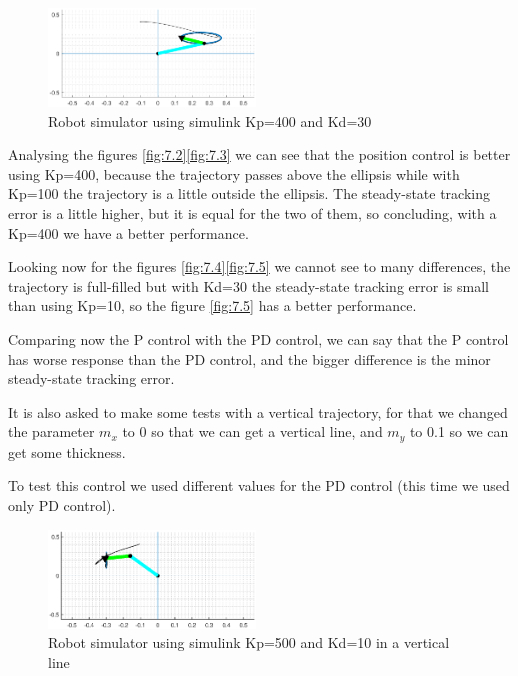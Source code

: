 \begin{figure}[H]
    \centering
    \includegraphics[width=0.49\textwidth]{imgs/7.5.eps}
    \caption{Robot simulator using simulink Kp=400 and Kd=30}
    \label{fig:7.5}
\end{figure}

Analysing the figures \eqref{fig:7.2}\eqref{fig:7.3} we can see that the position control is better using Kp=400, because the trajectory passes above the ellipsis while with Kp=100 the trajectory is a little outside the ellipsis. The steady-state tracking error is a little higher, but it is equal for the two of them, so concluding, with a Kp=400 we have a better performance.

Looking now for the figures \eqref{fig:7.4}\eqref{fig:7.5} we cannot see to many differences, the trajectory is full-filled but with Kd=30 the steady-state tracking error is small than using Kp=10, so the figure \eqref{fig:7.5} has a better performance.

Comparing now the P control with the PD control, we can say that the P control has worse response than the PD control, and the bigger difference is the minor steady-state tracking error.

It is also asked to make some tests with a vertical trajectory, for that we changed the parameter $m_x$ to 0 so that we can get a vertical line, and $m_y$ to 0.1 so we can get some thickness.

To test this control we used different values for the PD control (this time we used only PD control).

\begin{figure}[H]
    \centering
    \includegraphics[width=0.49\textwidth]{imgs/71.1.eps}
    \caption{Robot simulator using simulink Kp=500 and Kd=10 in a vertical line}
    \label{fig:71.1}
\end{figure}

